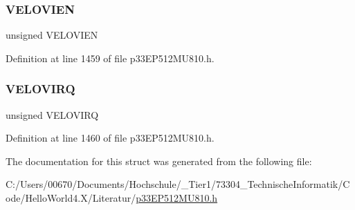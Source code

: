 \mbox{\label{structtag_q_e_i1_s_t_a_t_b_i_t_s_ae01860f2dc36a69ff1e81ce65661c28d}} 
\subsubsection{\texorpdfstring{V\+E\+L\+O\+V\+I\+EN}{VELOVIEN}}
{\footnotesize\ttfamily unsigned V\+E\+L\+O\+V\+I\+EN}



Definition at line 1459 of file p33\+E\+P512\+M\+U810.\+h.

\mbox{\label{structtag_q_e_i1_s_t_a_t_b_i_t_s_ad75eda4eefa6358d4d1d03b82b30ce9c}} 
\subsubsection{\texorpdfstring{V\+E\+L\+O\+V\+I\+RQ}{VELOVIRQ}}
{\footnotesize\ttfamily unsigned V\+E\+L\+O\+V\+I\+RQ}



Definition at line 1460 of file p33\+E\+P512\+M\+U810.\+h.



The documentation for this struct was generated from the following file\+:\begin{DoxyCompactItemize}
\item 
C\+:/\+Users/00670/\+Documents/\+Hochschule/\+\_\+\+Tier1/73304\+\_\+\+Technische\+Informatik/\+Code/\+Hello\+World4.\+X/\+Literatur/\hyperlink{p33_e_p512_m_u810_8h}{p33\+E\+P512\+M\+U810.\+h}\end{DoxyCompactItemize}
